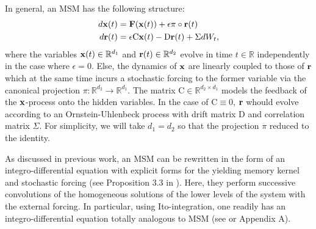 \documentclass[12pt]{article}
\begin{document}
In general, an MSM has the following structure:
\begin{align}\label{msm1}
d\mathbf{x}(t)&=\mathbf{F} (\mathbf{x}(t)) + \epsilon \pi \circ \mathbf{r}(t) \\\label{msm2}
d\mathbf{r}(t)&=\epsilon \mathrm{C}\mathbf{x}(t) -\mathrm{D}\mathbf{r}(t) + \Sigma dW_t,
\end{align}
where the variables $\mathbf{x}(t)\in \mathbb{R}^{d_1}$ and $\mathbf{r}(t)\in \mathbb{R}^{d_2}$ evolve in time $t\in \mathbb{R}$ independently in the case where $\epsilon =0$. Else, the dynamics of $\mathbf{x}$ are linearly coupled to those of $\mathbf{r}$ which at the same time incurs a stochastic forcing to the former variable via the canonical projection $\pi: \mathbb{R}^{d_2} \longrightarrow \mathbb{R}^{d_1}$. The matrix $\mathrm{C}\in \mathbb{R}^{d_2\times d_1}$ models the feedback of the $\mathbf{x}$-process onto the hidden variables. In the case of $\mathrm{C}\equiv 0$, $\mathbf{r}$ whould evolve according to an Ornstein-Uhlenbeck process with drift matrix $\mathrm{D}$ and correlation matrix $\Sigma$. For simplicity, we will take $d_1=d_2$ so that the projection $\pi$ reduced to the identity.

As discussed in previous work, an MSM can be rewritten in the form of an integro-differential equation with explicit forms for the yielding memory kernel and stochastic forcing (see Proposition 3.3 in \cite{kondrashovdata2015}). Here, they perform successive convolutions of the homogeneous solutions of the lower levels of the system with the external forcing. In particular, using Ito-integration, one readily has an integro-differential equation totally analogous to MSM (see \cite{kondrashovdata2015} or Appendix A). 
\end{document}
